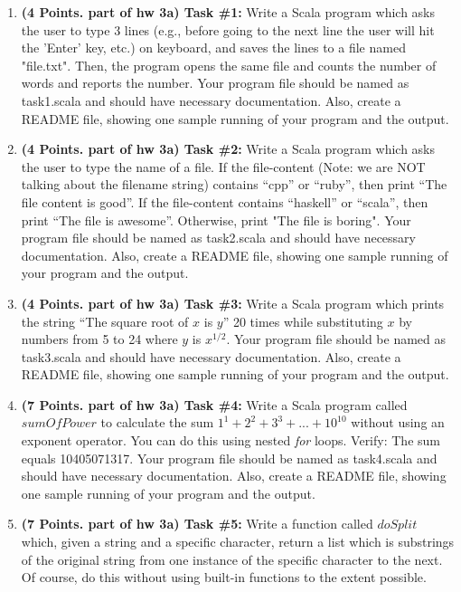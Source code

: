 \documentclass[paper=letter, fontsize=11pt]{scrartcl} %
\begin{document}
      \begin{enumerate}

        \item \textbf{(4 Points. part of hw 3a) Task \#1:} Write a Scala program 
which asks the user to type 3 lines (e.g., before going to the
next line the user will hit the 'Enter' key, etc.) on keyboard, 
and saves the lines to a file named "file.txt". Then, the program opens the same file and counts the number of words 
and reports the number. Your program file should be named as task1.scala and should have necessary documentation. 
Also, create a README file, showing one sample running of your program and the output.

        \item \textbf{(4 Points. part of hw 3a) Task \#2:} Write a Scala program which asks 
the user to type the name of a file.
If the file-content (Note: we are NOT talking about the filename string)
contains ``cpp'' or ``ruby'', then print ``The file content is good''. 
If the file-content contains ``haskell'' or ``scala'',
then print ``The file is awesome''. Otherwise, print "The file is boring".
Your program file should be named as task2.scala and should have necessary documentation. 
Also, create a README file, showing one sample running of your program and the output.

        \item \textbf{(4 Points. part of hw 3a) Task \#3:} Write a Scala program which 
prints the string ``The square root of $x$ is $y$'' 20 times 
while substituting $x$ by numbers from 5 to 24 where $y$ is $x^{1/2}$.
Your program file should be named as task3.scala and should have necessary documentation. 
Also, create a README file, showing one sample running of your program and the output.

\item \textbf{(7 Points. part of hw 3a) Task \#4:} Write a Scala program called $sumOfPower$ to calculate the 
sum $1^1 + 2^2 + 3^3 + ... + 10^{10}$ without using an exponent operator.  
You can do this using nested \emph{for} loops.  Verify:  The sum equals 10405071317.
Your program file should be named as task4.scala and should have necessary documentation. 
Also, create a README file, showing one sample running of your program and the output.

\item \textbf{(7 Points. part of hw 3a) Task \#5:} Write a function called $doSplit$ which, 
given a string and a specific character, 
return a list which is substrings of the original string 
from one instance of the specific character to the next.  
Of course, do this without using built-in functions to the extent possible.


\end{enumerate}
\end{document}
